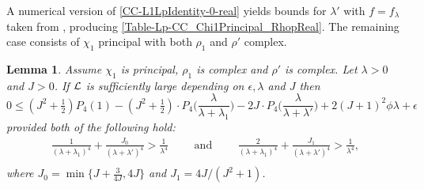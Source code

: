 \documentclass[12pt,psamsfonts]{amsart}
\newtheorem{lem}[thm]{Lemma}
\theoremstyle{definition}
\theoremstyle{remark}
\numberwithin{equation}{section}
\begin{document}
A numerical version of \cref{CC-L1LpIdentity-0-real} yields bounds for $\lambda'$  with $f = f_{\lambda}$ taken from \cite[Lemma 7.2]{HBLinnik}, producing \cref{Table-Lp-CC_Chi1Principal_RhopReal}. The remaining case consists of $\chi_1$ principal  with both $\rho_1$ and $\rho'$ complex.

\begin{lem} \label{CC-L1LpIdentity_Principal} Assume $\chi_1$ is principal, $\rho_1$ is complex and $\rho'$ is complex. Let  $\lambda > 0$ and $J  > 0$. If $\mathcal{L}$ is sufficiently large depending on $\epsilon, \lambda$ and $J$ then
\[
0 \leq  (J^2+\tfrac{1}{2}) P_4(1) -  (J^2+\tfrac{1}{2}) \cdot P_4\big( \frac{\lambda}{\lambda+\lambda_1} \big) - 2J \cdot P_4\big( \frac{\lambda}{\lambda+\lambda'}\big)  + 2(J+1)^2 \phi \lambda + \epsilon
\]
provided both of the following hold:
\begin{equation}
\begin{aligned}
	\frac{1}{(\lambda+\lambda_1)^4} + \frac{J_0}{(\lambda+\lambda')^4} > \frac{1}{\lambda^4} \qquad \text{ and } 
	\qquad	\frac{2}{(\lambda+\lambda_1)^4} + \frac{J_1}{(\lambda+\lambda')^4} > \frac{1}{\lambda^4}, \\
\end{aligned}
 \label{CC-L1LpIdentity_Principal-Condition}
\end{equation}
where $J_0 = \min\{ J+\tfrac{3}{4J}, 4J \}$ and $J_1 = 4J/(J^2+1)$.  
\end{lem}
\end{document}
